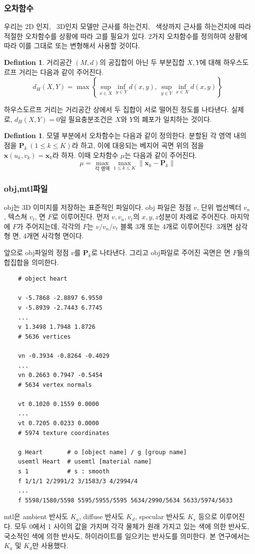 \documentclass{gshs_thesis}
\theoremstyle{theorem}
\theoremstyle{lemma}
\theoremstyle{definition}
\newtheorem{definition}[theorem]{Defintion}
\begin{document}
\subsubsection{오차함수}
우리는 2D 인지, \ 3D인지 모델만 근사를 하는건지, \ 색상까지 근사를 하는건지에 따라 적절한 오차함수를 상황에 따라 고를 필요가 있다. 2가지 오차함수를 정의하여 상황에 따라 이를 그대로 또는 변형해서 사용할 것이다. 
\begin{definition}
	거리공간 $(M, d)$의 공집합이 아닌 두 부분집합 $X, Y$에 대해 하우스도르프 거리는 다음과 같이 주어진다. \cite{Munkres.J.}
	\begin{equation} \label{hausdorffdistance}
		d_H(X, Y) = \max \left\{ \sup_{x \in X} \inf_{y \in Y} d(x, y), \, \sup_{y \in Y} \inf_{x \in X} d(x, y) \right\}
	\end{equation}
\end{definition}
하우스도르프 거리는 거리공간 상에서 두 집합이 서로 떨어진 정도를 나타낸다. 실제로, $d_H(X, Y) = 0$일 필요충분조건은 $X$와 $Y$의 폐포가 일치하는 것이다. 
\begin{definition}
	모델 부분에서 오차함수는 다음과 같이 정의한다. 분할된 각 영역 내의 점을 $\mathbf{P}_k\ (1\leq k\leq K)$라 하고, 이에 대응되는 베지어 곡면 위의 점을 $\mathbf{x}(u_k, v_k)=\mathbf{x}_k$라 하자. 이때 오차함수 $\mu$는 다음과 같이 주어진다.
	\begin{equation} \label{error2}
		\mu=\max_{\text{각 영역}}\max_{1\leq k\leq K} \| \mathbf{x}_k-\mathbf{P}_k \|
	\end{equation}
\end{definition}
\subsubsection{obj,mtl파일}
obj는 3D 이미지를 저장하는 표준적인 파일이다. obj 파일은 정점 $v$, 단위 법선벡터 $v_n$, 텍스쳐 $v_t$, 면 $F$로 이루어진다. 먼저 $v, v_n, v_t$의 $x, y, z$성분이 차례로 주어진다. 마지막에 $F$가 주어지는데, 각각의 $F$는 $v / v_n / v_t$ 블록 3개 또는 4개로 이루어진다. 3개면 삼각형 면, 4개면 사각형 면이다. 

앞으로 obj파일의 정점 $v$를 $\mathbf{P}_k$로 나타낸다. 그리고 obj파일로 주어진 곡면은 면 $F$들의 합집합을 의미한다.
\begin{verbatim}
	# object heart
	
	v -5.7868 -2.8897 6.9550
	v -5.8939 -2.7443 6.7745
	...
	v 1.3498 1.7948 1.8726
	# 5636 vertices
	
	vn -0.3934 -0.8264 -0.4029
	...
	vn 0.2663 0.7947 -0.5454
	# 5634 vertex normals
	
	vt 0.1020 0.1559 0.0000
	...
	vt 0.7205 0.0233 0.0000
	# 5974 texture coordinates
	
	g Heart       # o [object name] / g [group name] 
	usemtl Heart  # usemtl [material name]
	s 1           # s : smooth
	f 1/1/1 2/2991/2 3/1583/3 4/2994/4
	...
	f 5598/1580/5598 5595/5955/5595 5634/2990/5634 5633/5974/5633
\end{verbatim} 
mtl은 ambient 반사도 $K_a$, diffuse 반사도 $K_d$, specular 반사도 $K_s$ 등으로 이루어진다. 모두 0에서 1 사이의 값을 가지며 각각 물체가 원래 가지고 있는 색에 의한 반사도, 국소적인 색에 의한 반사도, 하이라이트를 일으키는 반사도를 의미한다. 본 연구에서는 $K_a$ 및 $K_d$만 사용했다. 
\end{document}
